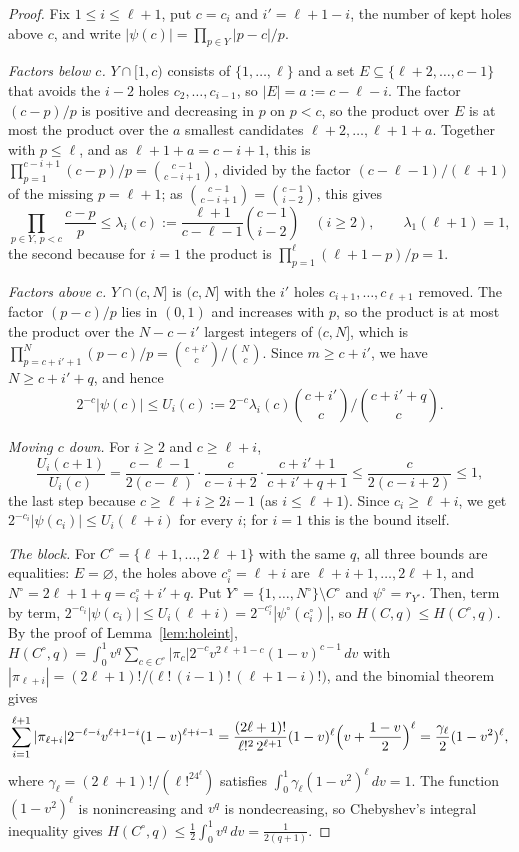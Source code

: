 \documentclass[11pt]{article}
\begin{document}
\begin{proof}
Fix $1\le i\le \ell+1$, put $c=c_i$ and $i'=\ell+1-i$, the number of kept holes
above $c$, and write $|\psi(c)|=\prod_{p\in Y}|p-c|/p$.

\emph{Factors below $c$.}  $Y\cap[1,c)$ consists of $\{1,\ldots,\ell\}$ and a
set $E\subseteq\{\ell+2,\ldots,c-1\}$ that avoids the $i-2$ holes
$c_2,\ldots,c_{i-1}$, so $|E|=a:=c-\ell-i$.  The factor $(c-p)/p$ is
positive and decreasing in $p$ on $p<c$, so the product over $E$ is at
most the product over the $a$ smallest candidates $\ell+2,\ldots,\ell+1+a$.
Together with $p\le\ell$, and as $\ell+1+a=c-i+1$, this is
$\prod_{p=1}^{c-i+1}(c-p)/p=\binom{c-1}{c-i+1}$, divided by the factor
$(c-\ell-1)/(\ell+1)$ of the missing $p=\ell+1$; as $\binom{c-1}{c-i+1}=\binom{c-1}{i-2}$, this gives
\[
  \prod_{p\in Y,\,p<c}\frac{c-p}p\le\lambda_i(c):=
  \frac{\ell+1}{c-\ell-1}\binom{c-1}{i-2}\quad(i\ge2),\qquad\lambda_1(\ell+1)=1,
\]
the second because for $i=1$ the product is
$\prod_{p=1}^{\ell}(\ell+1-p)/p=1$.

\emph{Factors above $c$.}  $Y\cap(c,N]$ is $(c,N]$ with the $i'$ holes
$c_{i+1},\ldots,c_{\ell+1}$ removed.  The factor $(p-c)/p$ lies in $(0,1)$ and
increases with $p$, so the product is at most the product over the
$N-c-i'$ largest integers of $(c,N]$, which is
$\prod_{p=c+i'+1}^{N}(p-c)/p=\binom{c+i'}c\big/\binom Nc$.  Since
$m\ge c+i'$, we have $N\ge c+i'+q$, and hence
\[
  2^{-c}|\psi(c)|\le U_i(c):=2^{-c}\lambda_i(c)
        \binom{c+i'}c\Big/\binom{c+i'+q}c .
\]

\emph{Moving $c$ down.}  For $i\ge2$ and $c\ge \ell+i$,
\[
  \frac{U_i(c+1)}{U_i(c)}
  =\frac{c-\ell-1}{2(c-\ell)}\cdot\frac c{c-i+2}\cdot\frac{c+i'+1}{c+i'+q+1}
  \le\frac c{2(c-i+2)}\le1,
\]
the last step because $c\ge \ell+i\ge2i-1$ (as $i\le \ell+1$).  Since
$c_i\ge \ell+i$, we get $2^{-c_i}|\psi(c_i)|\le U_i(\ell+i)$ for every $i$; for $i=1$
this is the bound itself.

\emph{The block.}  For $C^\circ=\{\ell+1,\ldots,2\ell+1\}$ with the same $q$, all
three bounds are equalities: $E=\varnothing$, the holes above
$c_i^\circ=\ell+i$ are $\ell+i+1,\ldots,2\ell+1$, and
$N^\circ=2\ell+1+q=c_i^\circ+i'+q$.
Put $Y^\circ=\{1,\ldots,N^\circ\}\setminus C^\circ$ and $\psi^\circ=r_{Y^\circ}$.
Then, term by term,
$2^{-c_i}|\psi(c_i)|\le U_i(\ell+i)=2^{-c_i^\circ}|\psi^\circ(c_i^\circ)|$, so
$H(C,q)\le H(C^\circ,q)$.  By the proof of Lemma~\ref{lem:holeint},
$H(C^\circ,q)=\int_0^1v^q\sum_{c\in C^\circ}|\pi_c|2^{-c}v^{2\ell+1-c}(1-v)^{c-1}\,dv$
with $|\pi_{\ell+i}|=(2\ell+1)!/\bigl(\ell!\,(i-1)!\,(\ell+1-i)!\bigr)$, and the binomial
theorem gives
\[
  \sum_{i=1}^{\ell+1}|\pi_{\ell+i}|2^{-\ell-i}v^{\ell+1-i}(1-v)^{\ell+i-1}
  =\frac{(2\ell+1)!}{\ell!^2\,2^{\ell+1}}(1-v)^\ell\Bigl(v+\frac{1-v}2\Bigr)^\ell
  =\frac{\gamma_\ell}2(1-v^2)^\ell,
\]
where $\gamma_\ell=(2\ell+1)!/(\ell!^24^\ell)$ satisfies
$\int_0^1\gamma_\ell(1-v^2)^\ell\,dv=1$.  The function $(1-v^2)^\ell$ is
nonincreasing and $v^q$ is nondecreasing, so Chebyshev's integral inequality
gives $H(C^\circ,q)\le\frac12\int_0^1v^q\,dv=\frac1{2(q+1)}$.
\end{proof}
\end{document}
